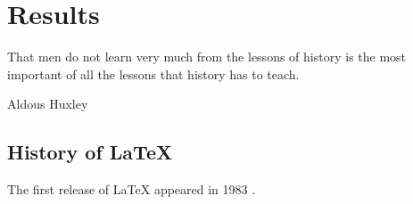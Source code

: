 \section{Results}
\label{ch:results}

\epigraph{That men do not learn very much from the lessons of history is the most important of all the lessons that history has to teach.}{Aldous Huxley}

\subsection{History of \LaTeX}

The first release of \LaTeX \cite{lamport1994latex} appeared in 1983 \cite{lamport2007writings}.

\cleardoublepage
